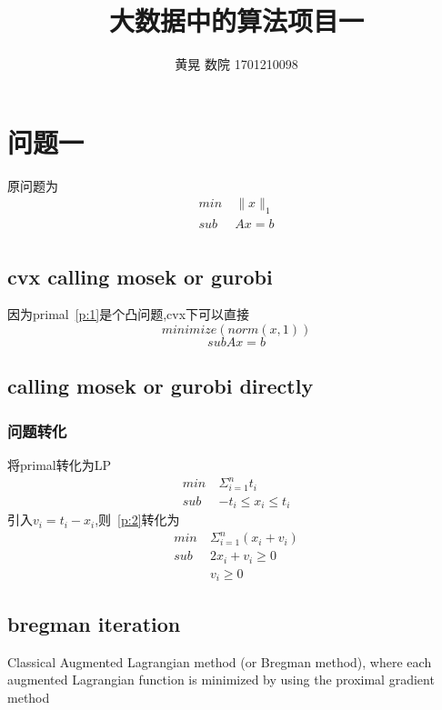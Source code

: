 \documentclass[UTF8]{ctexart}
\author{黄晃 数院 1701210098 }
\title{大数据中的算法项目一}
\begin{document}


  \maketitle
  \section{问题一}
  原问题为
  \begin{equation}\label{p:1}
    \begin{split}
       min\  &  \|x\|_{1} \\
       sub\  &  Ax = b\\
    \end{split}
  \end{equation}
  \subsection{cvx calling mosek or gurobi}
  因为primal~\ref{p:1}是个凸问题,cvx下可以直接
  $$minimize(norm(x,1))$$
  $$sub Ax=b$$
  \subsection{calling mosek or gurobi directly}
  \subsubsection{问题转化}
  将primal转化为LP
        \begin{equation}\label{p:2}
    \begin{split}
    min\  &  \Sigma_{i=1}^{n}t_{i} \\
    sub\  & -t_{i} \leq x_{i}\leq t_{i}
    \end{split}
  \end{equation}
  引入$v_{i}=t_{i}-x_{i}$,则~\ref{p:2}转化为
      \begin{equation}\label{p:3}
    \begin{split}
    min\  &  \Sigma_{i=1}^{n}(x_{i}+v_{i}) \\
    sub\  & 2x_{i}+v_{i} \geq 0 \\
            & v_{i} \geq 0
    \end{split}
  \end{equation}

  \subsection{bregman iteration}
   Classical Augmented Lagrangian method (or Bregman method), where each augmented Lagrangian function is minimized by using the proximal gradient method
\end{document}
